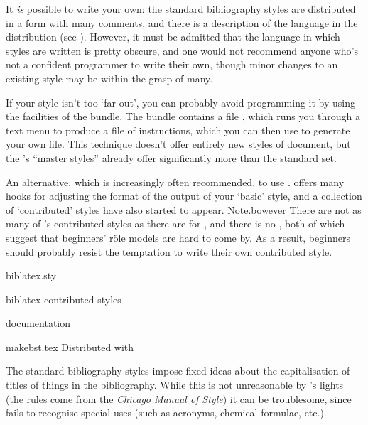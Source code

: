 
It \emph{is} possible to write your own: the standard bibliography
styles are distributed in a form with many comments, and there is a description
of the language in the \bibtex{} distribution (see %
).
However, it must be admitted that the language in which \BibTeX{}
styles are written is pretty obscure, and one would not recommend
anyone who's not a confident programmer to write their own, though
minor changes to an existing style may be within the grasp of many.

If your style isn't too `far out', you can probably avoid programming
it by using the facilities of the  bundle.  The bundle
contains a file , which runs you through a text menu
to produce a file of instructions, which you can then use to generate your
own  file.  This technique doesn't offer entirely new styles
of document, but the 's ``master \BibTeX{}
styles'' already offer significantly more than the \BibTeX{} standard set.

An alternative, which is increasingly often recommended, to use
.   offers
many hooks for adjusting the format of the output of your `basic'
\bibtex{} style, and a collection of `contributed' styles have also
started to appear.  Note.bowever There are not as many of
's contributed styles as there are for \bibtex{},
and there is no , both of which suggest that
beginners' r\"ole models are hard to come by.  As a result, beginners
should probably resist the temptation to write their own contributed
 style.
\begin{ctanrefs}
\item[biblatex.sty]
\item[biblatex \nothtml{\normalfont}contributed styles]
\item[\nothtml{\normalfont}\BibTeX{} documentation]
\item[makebst.tex]Distributed with 
\end{ctanrefs}


The standard \BibTeX{} bibliography styles impose fixed ideas about
the capitalisation of titles of things in the bibliography.  While
this is not unreasonable by \BibTeX{}'s lights (the rules come from
the \emph{Chicago Manual of Style}) it can be troublesome, since
\BibTeX{} fails to recognise special uses (such as acronyms, chemical
formulae, etc.).

